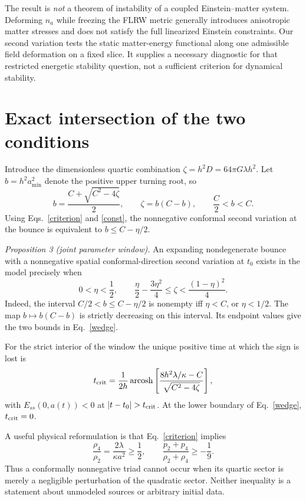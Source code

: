 \documentclass[aps,prd,reprint,longbibliography,nofootinbib,superscriptaddress]{revtex4-2}
\begin{document}
The result is \emph{not} a theorem of instability of a coupled Einstein--matter system. Deforming $n_a$ while freezing the FLRW metric generally introduces anisotropic matter stresses and does not satisfy the full linearized Einstein constraints. Our second variation tests the static matter-energy functional along one admissible field deformation on a fixed slice. It supplies a necessary diagnostic for that restricted energetic stability question, not a sufficient criterion for dynamical stability.

\section{Exact intersection of the two conditions}
Introduce the dimensionless quartic combination $\zeta=h^2D=64\pi G\lambda h^2$. Let $b=h^2a_{\min}^2$ denote the positive upper turning root, so
\begin{equation}\label{broot}
 b=\frac{C+\sqrt{C^2-4\zeta}}2,\qquad
 \zeta=b(C-b),\qquad \frac C2<b<C.
\end{equation}
Using Eqs.~\eqref{criterion} and \eqref{const}, the nonnegative conformal second variation at the bounce is equivalent to $b\le C-\eta/2$.

\textit{Proposition 3 (joint parameter window).} An expanding nondegenerate bounce with a nonnegative spatial conformal-direction second variation at $t_0$ exists in the model precisely when
\begin{equation}\label{wedge}
 \boxed{\ 0<\eta<\frac12,\qquad
 \frac\eta2-\frac{3\eta^2}{4}\le\zeta
 <\frac{(1-\eta)^2}{4}.\ }
\end{equation}
Indeed, the interval $C/2<b\le C-\eta/2$ is nonempty iff $\eta<C$, or $\eta<1/2$. The map $b\mapsto b(C-b)$ is strictly decreasing on this interval. Its endpoint values give the two bounds in Eq.~\eqref{wedge}.

For the strict interior of the window the unique positive time at which the sign is lost is
\begin{equation}\label{tcrit}
 t_{\rm crit}=\frac1{2h}\operatorname{arcosh}\left[
 \frac{8h^2\lambda/\kappa-C}{\sqrt{C^2-4\zeta}}
 \right],
\end{equation}
with $E_{ss}(0,a(t))<0$ at $|t-t_0|>t_{\rm crit}$. At the lower boundary of Eq.~\eqref{wedge}, $t_{\rm crit}=0$.

A useful physical reformulation is that Eq.~\eqref{criterion} implies
\begin{equation}\label{price}
 \frac{\rho_4}{\rho_2}=\frac{2\lambda}{\kappa a^2}\ge\frac12,
 \qquad \frac{p_2+p_4}{\rho_2+\rho_4}\ge-\frac19.
\end{equation}
Thus a conformally nonnegative triad cannot occur when its quartic sector is merely a negligible perturbation of the quadratic sector. Neither inequality is a statement about unmodeled sources or arbitrary initial data.
\end{document}
